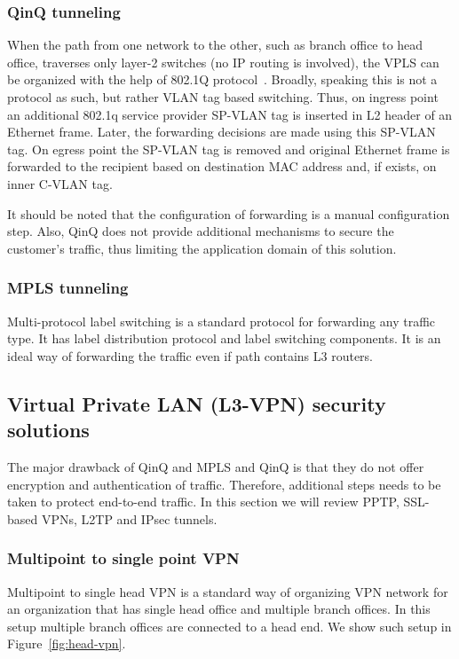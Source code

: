 \subsubsection{QinQ tunneling}

When the path from one network to the other, such as branch office to head office,
traverses only layer-2 switches (\ie no IP routing is involved), the VPLS can be organized 
with the help of 802.1Q protocol~\cite{snr}. Broadly, speaking this is not a protocol as such, but rather 
VLAN tag based switching. Thus, on ingress point an additional 802.1q service provider SP-VLAN tag 
is inserted in L2 header of an Ethernet frame. Later, the forwarding decisions are 
made using this SP-VLAN tag. On egress point the SP-VLAN tag is removed and original 
Ethernet frame is forwarded to the recipient based on destination MAC address 
and, if exists, on inner C-VLAN tag. 

It should be noted that the configuration of forwarding is a manual configuration step.
Also, QinQ does not provide additional mechanisms to secure the customer's traffic,
thus limiting the application domain of this solution.

\subsubsection{MPLS tunneling}

Multi-protocol label switching is a standard protocol for forwarding any traffic type.
It has label distribution protocol and label switching components. It is an ideal way 
of forwarding the traffic even if path contains L3 routers.

\subsection{Virtual Private LAN (L3-VPN) security solutions}

The major drawback of QinQ and MPLS and QinQ is that they do not offer encryption and 
authentication of traffic. Therefore, additional steps needs to be taken to protect end-to-end
traffic. In this section we will review PPTP, SSL-based VPNs, L2TP and IPsec tunnels.

\subsubsection{Multipoint to single point VPN}

Multipoint to single head VPN is a standard way of organizing VPN network
for an organization that has single head office and multiple branch offices.
In this setup multiple branch offices are connected to a head end. 
We show such setup in Figure~\ref{fig:head-vpn}.

